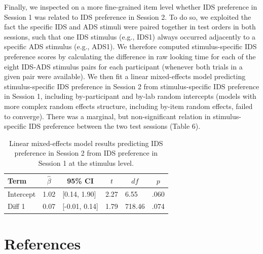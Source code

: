 \documentclass[
  man, donotrepeattitle,floatsintext]{apa6}
\begin{document}
Finally, we inspected on a more fine-grained item level whether IDS preference in Session 1 was related to IDS preference in Session 2.
To do so, we exploited the fact the specific IDS and ADS stimuli were paired together in test orders in both sessions, such that one IDS stimulus (e.g., IDS1) always occurred adjacently to a specific ADS stimulus (e.g., ADS1).
We therefore computed stimulus-specific IDS preference scores by calculating the difference in raw looking time for each of the eight IDS-ADS stimulus pairs for each participant (whenever both trials in a given pair were available).
We then fit a linear mixed-effects model predicting stimulus-specific IDS preference in Session 2 from stimulus-specific IDS preference in Session 1, including by-participant and by-lab random intercepts (models with more complex random effects structure, including by-item random effects, failed to converge).
There was a marginal, but non-significant relation in stimulus-specific IDS preference between the two test sessions (Table 6).

\begin{table}[tbp]

\begin{center}
\begin{threeparttable}

\caption{\label{tab:unnamed-chunk-44}Linear mixed-effects model results predicting IDS preference in Session 2 from IDS preference in Session 1 at the stimulus level.}

\begin{tabular}{llllll}
\toprule
Term & \multicolumn{1}{c}{$\hat{\beta}$} & \multicolumn{1}{c}{95\% CI} & \multicolumn{1}{c}{$t$} & \multicolumn{1}{c}{$\mathit{df}$} & \multicolumn{1}{c}{$p$}\\
\midrule
Intercept & 1.02 & {}[0.14, 1.90] & 2.27 & 6.55 & .060\\
Diff 1 & 0.07 & {}[-0.01, 0.14] & 1.79 & 718.46 & .074\\
\bottomrule
\end{tabular}

\end{threeparttable}
\end{center}

\end{table}

\newpage

\hypertarget{references}{%
\section{References}\label{references}}
\end{document}

